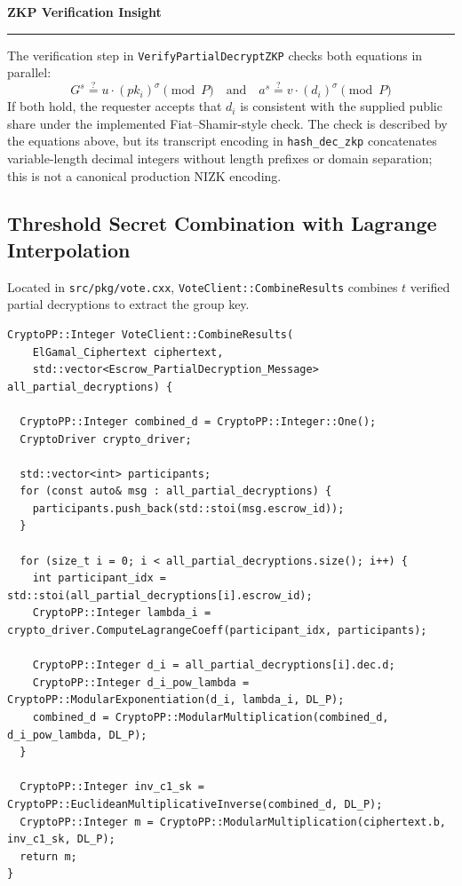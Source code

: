 \documentclass[11pt,a4paper]{article}
\newenvironment{infobox}[1][]
  {\begin{center}\begin{minipage}{0.88\textwidth}\noindent\textbf{#1}\par\smallskip\hrule\smallskip}
  {\end{minipage}\end{center}}
\begin{document}
\begin{infobox}[ZKP Verification Insight]
	The verification step in \texttt{VerifyPartialDecryptZKP} checks both equations in parallel:
	\[
		G^s \stackrel{?}{=} u \cdot (pk_i)^\sigma \pmod P \quad \text{and} \quad a^s \stackrel{?}{=} v \cdot (d_i)^\sigma \pmod P
	\]
	If both hold, the requester accepts that $d_i$ is consistent with the supplied public share under the implemented Fiat--Shamir-style check. The check is described by the equations above, but its transcript encoding in \texttt{hash\_dec\_zkp} concatenates variable-length decimal integers without length prefixes or domain separation; this is not a canonical production NIZK encoding.
\end{infobox}

\subsection{Threshold Secret Combination with Lagrange Interpolation}
Located in \texttt{src/pkg/vote.cxx}, \texttt{VoteClient::CombineResults} combines $t$ verified partial decryptions to extract the group key.

\begin{lstlisting}[caption={Lagrange Combination in \texttt{VoteClient::CombineResults}}]
CryptoPP::Integer VoteClient::CombineResults(
    ElGamal_Ciphertext ciphertext,
    std::vector<Escrow_PartialDecryption_Message> all_partial_decryptions) {

  CryptoPP::Integer combined_d = CryptoPP::Integer::One();
  CryptoDriver crypto_driver;

  std::vector<int> participants;
  for (const auto& msg : all_partial_decryptions) {
    participants.push_back(std::stoi(msg.escrow_id));
  }

  for (size_t i = 0; i < all_partial_decryptions.size(); i++) {
    int participant_idx = std::stoi(all_partial_decryptions[i].escrow_id);
    CryptoPP::Integer lambda_i = crypto_driver.ComputeLagrangeCoeff(participant_idx, participants);

    CryptoPP::Integer d_i = all_partial_decryptions[i].dec.d;
    CryptoPP::Integer d_i_pow_lambda = CryptoPP::ModularExponentiation(d_i, lambda_i, DL_P);
    combined_d = CryptoPP::ModularMultiplication(combined_d, d_i_pow_lambda, DL_P);
  }

  CryptoPP::Integer inv_c1_sk = CryptoPP::EuclideanMultiplicativeInverse(combined_d, DL_P);
  CryptoPP::Integer m = CryptoPP::ModularMultiplication(ciphertext.b, inv_c1_sk, DL_P);
  return m;
}
\end{lstlisting}
\end{document}
